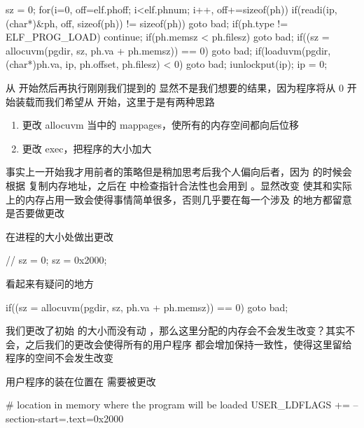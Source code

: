 \begin{ccode}
    sz = 0;
    for(i=0, off=elf.phoff; i<elf.phnum; i++, off+=sizeof(ph)){
        if(readi(ip, (char*)&ph, off, sizeof(ph)) != sizeof(ph))
        goto bad;
        if(ph.type != ELF_PROG_LOAD)
        continue;
        if(ph.memsz < ph.filesz)
        goto bad;
        if((sz = allocuvm(pgdir, sz, ph.va + ph.memsz)) == 0)
        goto bad;
        if(loaduvm(pgdir, (char*)ph.va, ip, ph.offset, ph.filesz) < 0)
        goto bad;
    }
    iunlockput(ip);
    ip = 0;
\end{ccode}



从  开始然后再执行刚刚我们提到的  显然不是我们想要的结果，因为程序将从 0 开始装载而我们希望从  开始，这里于是有两种思路

\begin{enumerate}
    \item 更改 allocuvm 当中的 mappages，使所有的内存空间都向后位移 
    \item 更改 exec，把程序的大小加大 
\end{enumerate}

事实上一开始我才用前者的策略但是稍加思考后我个人偏向后者，因为  的时候会根据  复制内存地址，之后在  中检查指针合法性也会用到 。显然改变  使其和实际上的内存占用一致会使得事情简单很多，否则几乎要在每一个涉及  的地方都留意是否要做更改

在进程的大小处做出更改

\begin{ccode}
    // sz = 0;
    sz = 0x2000;
\end{ccode}

看起来有疑问的地方

\begin{ccode}
    if((sz = allocuvm(pgdir, sz, ph.va + ph.memsz)) == 0)
    goto bad;
\end{ccode}

我们更改了初始  的大小而没有动 ，那么这里分配的内存会不会发生改变？其实不会，之后我们的更改会使得所有的用户程序  都会增加保持一致性，使得这里留给程序的空间不会发生改变

用户程序的装在位置在  需要被更改

\begin{bashcode}
    # location in memory where the program will be loaded
    USER_LDFLAGS += --section-start=.text=0x2000
\end{bashcode}


